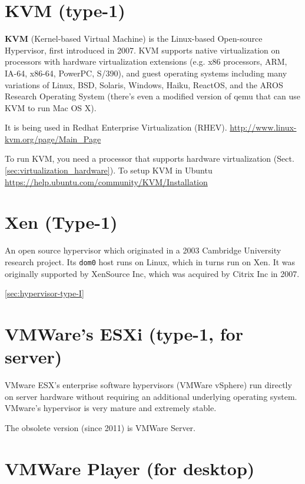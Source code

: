 \section{KVM (type-1)}
\label{sec:KVM}

{\bf KVM} (Kernel-based Virtual Machine) is the Linux-based Open-source
Hypervisor, first introduced in 2007. KVM supports native virtualization on
processors with hardware virtualization extensions (e.g. x86 processors, ARM,
IA-64, x86-64, PowerPC, S/390), and guest operating systems including many
variations of Linux, BSD, Solaris, Windows, Haiku, ReactOS, and the AROS
Research Operating System (there's even a modified version of qemu that can use
KVM to run Mac OS X).

It is being used in Redhat Enterprise Virtualization (RHEV).
\url{http://www.linux-kvm.org/page/Main_Page}

To run KVM, you need a processor that supports hardware virtualization
(Sect.\ref{sec:virtualization_hardware}). To setup KVM in Ubuntu
\url{https://help.ubuntu.com/community/KVM/Installation}

\section{Xen (Type-1)}
\label{sec:Xen}
\label{sec:Xen-hypervisor}


An open source hypervisor which originated in a 2003 Cambridge University
research project. Its \verb!dom0! host runs on Linux, which in turns run on Xen.
It was originally supported by XenSource Inc, which was acquired by Citrix Inc in 2007.

\ref{sec:hypervisor-type-I}

\section{VMWare's ESXi (type-1, for server)}
\label{sec:VMWare_ESXi}

VMware ESX's enterprise software hypervisors (VMWare vSphere) run directly on
server hardware without requiring an additional underlying operating system.
VMware's hypervisor is very mature and extremely stable.

The obsolete version (since 2011) is VMWare Server.

\section{VMWare Player (for desktop)}
\label{sec:VMWare_Player}


